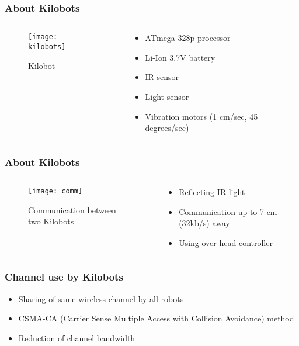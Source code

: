\begin{frame}
	\frametitle{About Kilobots}
	\begin{columns}
		\begin{column}{0.4\textwidth}
			\begin{figure}
				\centering
				\texttt{[image: kilobots]}
				\caption{Kilobot}
			\end{figure}
		\end{column}
						
		\begin{column}{0.45\textwidth}
			\begin{itemize}
				\item ATmega 328p processor 
				\item Li-Ion 3.7V battery 
				\item IR sensor 
				\item Light sensor 
				\item Vibration motors (1 cm/sec, 45 degrees/sec)
			\end{itemize}
		\end{column}
	\end{columns}
\end{frame}

\begin{frame}
	\frametitle{About Kilobots}
	\begin{columns}
		\begin{column}{0.4\textwidth}
			\begin{figure}
				\centering
				\texttt{[image: comm]}
				\caption{Communication between two Kilobots}
			\end{figure}
		\end{column}
						
		\begin{column}{0.45\textwidth}
			\begin{itemize}
				\item Reflecting IR light
				\item Communication up to 7 cm (32kb/s) away 
				\item Using over-head controller
			\end{itemize}
		\end{column}
	\end{columns}
\end{frame}

\begin{frame}
	\frametitle{Channel use by Kilobots}
	\begin{itemize}
		\item Sharing of same wireless channel by all robots
		\item CSMA-CA (Carrier Sense Multiple Access with Collision Avoidance) method 
		\item Reduction of channel bandwidth        
	\end{itemize}
\end{frame}
